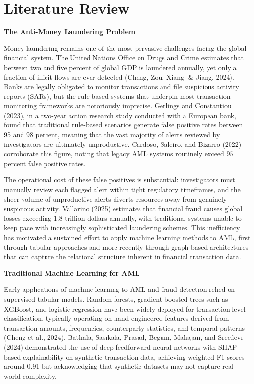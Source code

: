 \documentclass[12pt,a4paper]{article}
\begin{document}
\section{Literature Review}

\bigskip
\noindent\textbf{The Anti-Money Laundering Problem}

\noindent Money laundering remains one of the most pervasive challenges facing the global financial system. The United Nations Office on Drugs and Crime estimates that between two and five percent of global GDP is laundered annually, yet only a fraction of illicit flows are ever detected (Cheng, Zou, Xiang, \& Jiang, 2024). Banks are legally obligated to monitor transactions and file suspicious activity reports (SARs), but the rule-based systems that underpin most transaction monitoring frameworks are notoriously imprecise. Gerlings and Constantiou (2023), in a two-year action research study conducted with a European bank, found that traditional rule-based scenarios generate false positive rates between 95 and 98 percent, meaning that the vast majority of alerts reviewed by investigators are ultimately unproductive. Cardoso, Saleiro, and Bizarro (2022) corroborate this figure, noting that legacy AML systems routinely exceed 95 percent false positive rates.

The operational cost of these false positives is substantial: investigators must manually review each flagged alert within tight regulatory timeframes, and the sheer volume of unproductive alerts diverts resources away from genuinely suspicious activity. Vallarino (2025) estimates that financial fraud causes global losses exceeding 1.8 trillion dollars annually, with traditional systems unable to keep pace with increasingly sophisticated laundering schemes. This inefficiency has motivated a sustained effort to apply machine learning methods to AML, first through tabular approaches and more recently through graph-based architectures that can capture the relational structure inherent in financial transaction data.

\bigskip
\noindent\textbf{Traditional Machine Learning for AML}

\noindent Early applications of machine learning to AML and fraud detection relied on supervised tabular models. Random forests, gradient-boosted trees such as XGBoost, and logistic regression have been widely deployed for transaction-level classification, typically operating on hand-engineered features derived from transaction amounts, frequencies, counterparty statistics, and temporal patterns (Cheng et al., 2024). Bathala, Sasikala, Prasad, Begum, Mahajan, and Sreedevi (2024) demonstrated the use of deep feedforward neural networks with SHAP-based explainability on synthetic transaction data, achieving weighted F1 scores around 0.91 but acknowledging that synthetic datasets may not capture real-world complexity.
\end{document}
